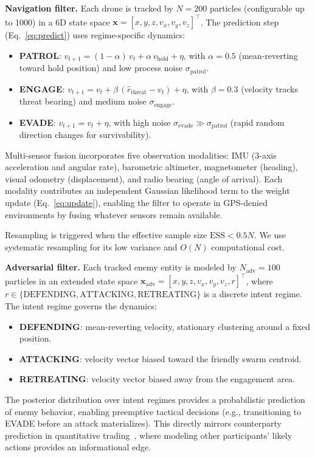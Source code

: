 \documentclass[conference]{IEEEtran}
\newcommand{\state}{\mathbf{x}}
\begin{document}
\textbf{Navigation filter.}\quad
Each drone is tracked by $N=200$ particles (configurable up to 1000)
in a 6D state space $\state = [x, y, z, v_x, v_y, v_z]^\top$.
The prediction step (Eq.~\ref{eq:predict}) uses regime-specific dynamics:
\begin{itemize}
\setlength{\itemsep}{0pt}
  \item \textbf{PATROL}: $v_{t+1} = (1-\alpha)\,v_t + \alpha\,v_{\text{hold}}
    + \eta$, with $\alpha=0.5$ (mean-reverting toward hold position)
    and low process noise $\sigma_{\text{patrol}}$.
  \item \textbf{ENGAGE}: $v_{t+1} = v_t + \beta\,(\hat{r}_{\text{threat}}
    - v_t) + \eta$, with $\beta=0.3$ (velocity tracks threat bearing)
    and medium noise $\sigma_{\text{engage}}$.
  \item \textbf{EVADE}: $v_{t+1} = v_t + \eta$, with high noise
    $\sigma_{\text{evade}} \gg \sigma_{\text{patrol}}$ (rapid random
    direction changes for survivability).
\end{itemize}

Multi-sensor fusion incorporates five observation modalities: IMU
(3-axis acceleration and angular rate), barometric altimeter,
magnetometer (heading), visual odometry (displacement), and radio
bearing (angle of arrival).  Each modality contributes an independent
Gaussian likelihood term to the weight update (Eq.~\ref{eq:update}),
enabling the filter to operate in GPS-denied environments by fusing
whatever sensors remain available.

Resampling is triggered when the effective sample size
$\text{ESS} < 0.5N$.  We use systematic resampling for its low
variance and $O(N)$ computational cost.

\textbf{Adversarial filter.}\quad
Each tracked enemy entity is modeled by $N_{\text{adv}}=100$ particles
in an extended state space $\state_{\text{adv}} = [x, y, z, v_x, v_y,
v_z, r]^\top$, where $r\in\{\text{DEFENDING}, \text{ATTACKING},
\text{RETREATING}\}$ is a discrete intent regime.  The intent regime
governs the dynamics:
\begin{itemize}
\setlength{\itemsep}{0pt}
  \item \textbf{DEFENDING}: mean-reverting velocity, stationary
    clustering around a fixed position.
  \item \textbf{ATTACKING}: velocity vector biased toward the friendly
    swarm centroid.
  \item \textbf{RETREATING}: velocity vector biased away from the
    engagement area.
\end{itemize}
The posterior distribution over intent regimes provides a probabilistic
prediction of enemy behavior, enabling preemptive tactical decisions
(e.g., transitioning to EVADE before an attack materializes).  This
directly mirrors counterparty prediction in quantitative
trading~\cite{hamilton1989new}, where modeling other participants'
likely actions provides an informational edge.
\end{document}
